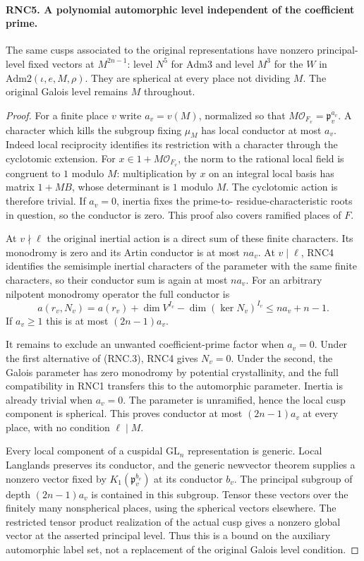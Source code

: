 \paragraph{RNC5. A polynomial automorphic level independent of the coefficient prime.}
\label{claim:RNC5}
The same cusps associated to the original representations have
nonzero principal-level fixed vectors at $M^{2n-1}$: level
$N^5$ for $\mathrm{Adm3}$ and level $M^3$ for the $W$ in
$\mathrm{Adm2}(\iota,e,M,\rho)$.  They are spherical at
every place not dividing $M$.  The original Galois level
remains $M$ throughout.
\begin{proof}
For a finite place $v$ write $a_v=v(M)$, normalized so that
$M\mathcal O_{F_v}=\mathfrak p_v^{a_v}$.  A character which
kills the subgroup fixing $\mu_M$ has local conductor at most
$a_v$.  Indeed local reciprocity identifies its restriction
with a character through the cyclotomic extension.  For
$x\in1+M\mathcal O_{F_v}$, the norm to the rational local
field is congruent to $1$ modulo $M$: multiplication by $x$
on an integral local basis has matrix $1+M B$, whose
determinant is $1$ modulo $M$.  The cyclotomic action is
therefore trivial.  If $a_v=0$, inertia fixes the prime-to-
residue-characteristic roots in question, so the conductor
is zero.  This proof also covers ramified places of $F$.

At $v\nmid\ell$ the original inertial action is a direct sum
of these finite characters.  Its monodromy is zero and its
Artin conductor is at most $n a_v$.  At $v\mid\ell$, RNC4
identifies the semisimple inertial characters of the parameter
with the same finite characters, so their conductor sum is
again at most $n a_v$.  For an arbitrary nilpotent monodromy
operator the full conductor is
\[
 a(r_v,N_v)=a(r_v)+\dim V^{I_v}-\dim(\ker N_v)^{I_v}
                              \leq n a_v+n-1.                 \tag{RNC.11}
\]
If $a_v\geq1$ this is at most $(2n-1)a_v$.

It remains to exclude an unwanted coefficient-prime factor
when $a_v=0$.  Under the first alternative of (RNC.3), RNC4
gives $N_v=0$.  Under the second, the Galois parameter has
zero monodromy by potential crystallinity, and the full
compatibility in RNC1 transfers this to the automorphic
parameter.  Inertia is already trivial when $a_v=0$.
The parameter is unramified, hence the local cusp component
is spherical.  This proves conductor at most $(2n-1)a_v$
at every place, with no condition $\ell\mid M$.

Every local component of a cuspidal $\mathrm{GL}_n$
representation is generic.  Local Langlands preserves its
conductor, and the generic newvector theorem supplies a
nonzero vector fixed by $K_1(\mathfrak p_v^{b_v})$ at its
conductor $b_v$.  The principal subgroup of depth
$(2n-1)a_v$ is contained in this subgroup.  Tensor these
vectors over the finitely many nonspherical places, using
the spherical vectors elsewhere.  The restricted tensor
product realization of the actual cusp gives a nonzero
global vector at the asserted principal level.  Thus this
is a bound on the auxiliary automorphic label set, not a
replacement of the original Galois level condition.
\end{proof}


